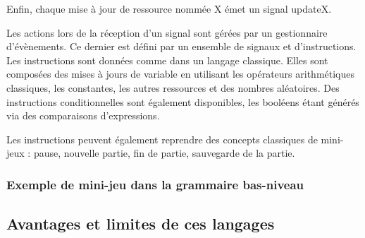 Enfin, chaque mise à jour de ressource nommée X émet un signal updateX.

Les actions lors de la réception d'un signal sont gérées par un gestionnaire d'évènements.
Ce dernier est défini par un ensemble de signaux et d'instructions.
Les instructions sont données comme dans un langage classique.
Elles sont composées des mises à jours de variable en utilisant les opérateurs arithmétiques classiques, les constantes, les autres ressources et des nombres
aléatoires.
Des instructions conditionnelles sont également disponibles, les booléens étant générés via des comparaisons d'expressions.

Les instructions peuvent également reprendre des concepts classiques de mini-jeux : pause, nouvelle partie, fin de partie, sauvegarde de la partie.

\subsubsection{Exemple de mini-jeu dans la grammaire bas-niveau}


\subsection{Avantages et limites de ces langages}